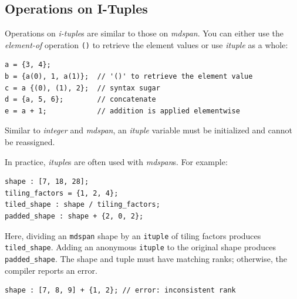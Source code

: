 \subsection*{Operations on I-Tuples}

Operations on \emph{i-tuple}s are similar to those on \emph{mdspan}. You can either use the \emph{element-of} operation \texttt{()} to retrieve the element values or use \emph{ituple} as a whole:

\begin{lstlisting}[language=croqtile,caption={Assigning a new tuple}]
a = {3, 4};
b = {a(0), 1, a(1)};  // '()' to retrieve the element value
c = a {(0), (1), 2};  // syntax sugar
d = {a, 5, 6};        // concatenate
e = a + 1;            // addition is applied elementwise
\end{lstlisting}

Similar to \emph{integer} and \emph{mdspan}, an \emph{ituple} variable must be initialized and cannot be reassigned.

In practice, \emph{ituple}s are often used with \emph{mdspan}s. For example:

\begin{lstlisting}[language=croqtile,caption={Indexing an mdspan with an i-tuple}]
shape : [7, 18, 28];
tiling_factors = {1, 2, 4};
tiled_shape : shape / tiling_factors;
padded_shape : shape + {2, 0, 2};
\end{lstlisting}

Here, dividing an \texttt{mdspan} shape by an \texttt{ituple} of tiling factors produces \texttt{tiled\_shape}. Adding an anonymous \texttt{ituple} to the original shape produces \texttt{padded\_shape}. The shape and tuple must have matching ranks; otherwise, the compiler reports an error.

\begin{lstlisting}[language=croqtile,caption={An invalid shape expression}]
shape : [7, 8, 9] + {1, 2}; // error: inconsistent rank
\end{lstlisting}
